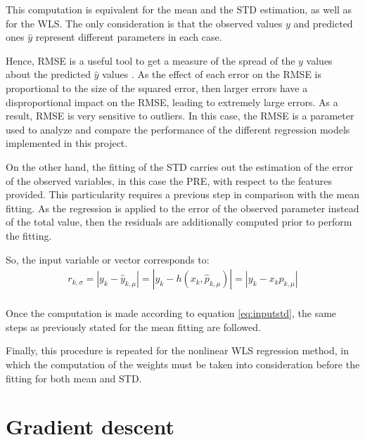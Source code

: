 \documentclass[a4paper, report, oneside, UKenglish]{memoir}
\begin{document}
This computation is equivalent for the mean and the STD estimation, as well as for the WLS. The only consideration is that the observed values $y$ and predicted ones $\hat{y}$ represent different parameters in each case.  
 
Hence, RMSE is a useful tool to get a measure of the spread of the $y$ values about the predicted $\hat{y}$ values \cite{StanfordRMSE}. As the effect of each error on the RMSE is proportional to the size of the squared error, then larger errors have a disproportional impact on the RMSE, leading to extremely large errors. As a result, RMSE is very sensitive to outliers. In this case, the RMSE is a parameter used to analyze and compare the performance of the different regression models implemented in this project.   

On the other hand, the fitting of the STD carries out the estimation of the error of the observed variables, in this case the PRE, with respect to the features provided. This particularity requires a previous step in comparison with the mean fitting. As the regression is applied to the error of the observed parameter instead of the total value, then the residuals are additionally computed prior to perform the fitting.  

So, the input variable or vector corresponds to:
\begin{equation}\label{eq:inputstd}
\begin{split}
    r_{k,\sigma} = |y_k - \hat{y}_{k,\mu}| = |y_k - h(x_{k},\hat{p}_{k,\mu})| = |y_k - x_{k}p_{k,\mu}|\\
\end{split}
\end{equation}

Once the computation is made according to equation \eqref{eq:inputstd}, the same steps as previously stated for the mean fitting are followed. 

Finally, this procedure is repeated for the nonlinear WLS regression method, in which the computation of the weights must be taken into consideration before the fitting for both mean and STD. 


\section{Gradient descent}
\end{document}
